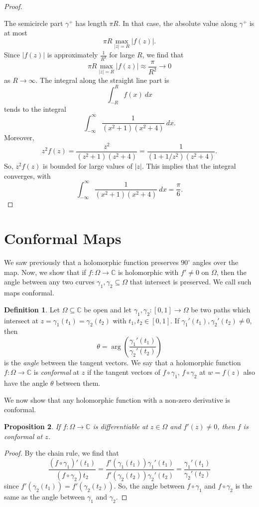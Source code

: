 \documentclass[a4paper, openany]{memoir}
\theoremstyle{definition}
\newtheorem{definition}{Definition}[section]
\theoremstyle{plain}
\newtheorem{proposition}[definition]{Proposition}
\begin{document}
\begin{proof}
\begin{figure}[H]
    \end{figure}
    \noindent The semicircle part $\gamma^+$ has length $\pi R$. In that case, the absolute value along $\gamma^+$ is at most
    \[\pi R \max_{|z| = R} |f(z)|.\]
    Since $|f(z)|$ is approximately $\frac{1}{R^4}$ for large $R$, we find that 
    \[\pi R \max_{|z| = R} |f(z)| \approx \frac{\pi}{R^2} \to 0\]
    as $R \to \infty$. The integral along the straight line part is
    \[\int_{-R}^R f(x) \ dx\]
    tends to the integral
    \[\int_{-\infty}^\infty \frac{1}{(x^2 + 1)(x^2 + 4)} \ dx.\]
    Moreover, 
    \[z^2 f(z) = \frac{z^2}{(z^2 + 1)(z^2 + 4)} = \frac{1}{(1 + 1/z^2)(z^2 + 4)}.\]
    So, $z^2 f(z)$ is bounded for large values of $|z|$. This implies that the integral converges, with
    \[\int_{-\infty}^\infty \frac{1}{(x^2 + 1)(x^2 + 4)} \ dx = \frac{\pi}{6}.\]
\end{proof}
\newpage

\section{Conformal Maps}
We saw previously that a holomorphic function preserves $90^{\circ}$ angles over the map. Now, we show that if $f: \Omega \to \mathbb{C}$ is holomorphic with $f' \neq 0$ on $\Omega$, then the angle between any two curves $\gamma_1, \gamma_2 \subseteq \Omega$ that intersect is preserved. We call such maps conformal.
\begin{definition}
    Let $\Omega \subseteq \mathbb{C}$ be open and let $\gamma_1, \gamma_2 : [0, 1] \to \Omega$ be two paths which intersect at $z = \gamma_1(t_1) = \gamma_2(t_2)$ with $t_1, t_2 \in [0, 1]$. If $\gamma_1'(t_1), \gamma_2'(t_2) \neq 0$, then 
    \[\theta = \operatorname{arg}\left(\frac{\gamma_1'(t_1)}{\gamma_2'(t_2)}\right)\]
    is the \emph{angle} between the tangent vectors. We say that a holomorphic function $f: \Omega \to \mathbb{C}$ is \emph{conformal} at $z$ if the tangent vectors of $f \circ \gamma_1$, $f \circ \gamma_2$ at $w = f(z)$ also have the angle $\theta$ between them.
\end{definition}

We now show that any holomorphic function with a non-zero derivative is conformal.
\begin{proposition}
    If $f: \Omega \to \mathbb{C}$ is differentiable at $z \in \Omega$ and $f'(z) \neq 0$, then $f$ is conformal at $z$.
\end{proposition}
\begin{proof}
    By the chain rule, we find that
    \[\frac{(f \circ \gamma_1)'(t_1)}{(f \circ \gamma_2)t_2} = \frac{f'(\gamma_1(t_1)) \gamma_1'(t_1)}{f'(\gamma_2(t_2)) \gamma_2'(t_2)} = \frac{\gamma_1'(t_1)}{\gamma_2'(t_2)}\]
    since $f'(\gamma_2(t_1)) = f'(\gamma_2(t_2))$. So, the angle between $f \circ \gamma_1$ and $f \circ \gamma_2$ is the same as the angle between $\gamma_1$ and $\gamma_2$.
\end{proof}
\end{document}
